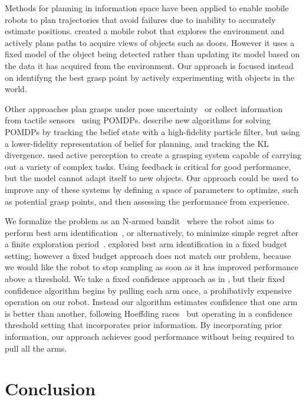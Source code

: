 \documentclass{article}
\begin{document}
Methods for planning in information space \citep{he08, atanasov13,
  prentice09} have been applied to enable mobile robots to plan
trajectories that avoid failures due to inability to accurately
estimate positions.  \citet{velez11} created a mobile robot that
explores the environment and actively plans paths to acquire views of
objects such as doors.  However it uses a fixed model of the object
being detected rather than updating its model based on the data it has
acquired from the environment.  Our approach is focused instead on
identifyng the best grasp point by actively experimenting with objects
in the world.

Other approaches plan grasps under pose uncertainty~\citep{stulp11} or
collect information from tactile sensors~\citep{hsiao10} using
POMDPs.  \citet{platt11} describe new algorithms for solving POMDPs by
tracking the belief state with a high-fidelity particle filter, but using
a lower-fidelity representation of belief for planning, and tracking
the KL divergence.  \citet{hudson12} used active perception to create
a grasping system capable of carrying out a variety of complex tasks.
Using feedback is critical for good performance, but the model cannot
adapt itself to new objects.  Our approach could be used to improve
any of these systems by defining a space of parameters to optimize,
such as potential grasp points, and then assessing the performance
from experience.

We formalize the problem as an N-armed bandit~\citep{thompson33} where
the robot aims to perform best arm identification~\citep{audibert10,
  chen14}, or alternatively, to minimize simple regret after a finite
exploration period~\citep{bubeck09}.  \citet{audibert10} explored best
arm identification in a fixed budget setting; however a fixed budget
approach does not match our problem, because we would like the robot
to stop sampling as soon as it has improved performance above a
threshold.  We take a fixed confidence approach as in \citet{chen14},
but their fixed confidence algorithm begins by pulling each arm once,
a prohibativly expensive operation on our robot.  Instead our
algorithm estimates confidence that one arm is better than another,
following Hoeffding races~\citep{maron93} but operating in a confidence
threshold setting that incorporates prior information.  By
incorporating prior information, our approach achieves good
performance without being required to pull all the arms.


\section{Conclusion}
\end{document}
